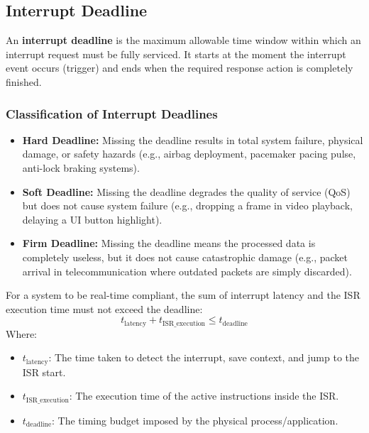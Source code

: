 \documentclass[12pt,a4paper]{article}
\begin{document}
\subsection{Interrupt Deadline}

\begin{tcolorbox}[defbox, title={\textbf{Interrupt Deadline}}]
An \textbf{interrupt deadline} is the maximum allowable time window within which an interrupt request must be fully serviced. It starts at the moment the interrupt event occurs (trigger) and ends when the required response action is completely finished.
\end{tcolorbox}

\subsubsection{Classification of Interrupt Deadlines}
\begin{itemize}[leftmargin=*, itemsep=3pt]
  \item \textbf{Hard Deadline:} Missing the deadline results in total system failure, physical damage, or safety hazards (e.g., airbag deployment, pacemaker pacing pulse, anti-lock braking systems).
  \item \textbf{Soft Deadline:} Missing the deadline degrades the quality of service (QoS) but does not cause system failure (e.g., dropping a frame in video playback, delaying a UI button highlight).
  \item \textbf{Firm Deadline:} Missing the deadline means the processed data is completely useless, but it does not cause catastrophic damage (e.g., packet arrival in telecommunication where outdated packets are simply discarded).
\end{itemize}

\begin{tcolorbox}[formulabox, title={\textbf{Real-Time Constraint \& Timing Budget}}]
For a system to be real-time compliant, the sum of interrupt latency and the ISR execution time must not exceed the deadline:
\[
t_{\text{latency}} + t_{\text{ISR\_execution}} \leq t_{\text{deadline}}
\]
Where:
\begin{itemize}[leftmargin=*, itemsep=2pt, topsep=4pt]
  \item $t_{\text{latency}}$: The time taken to detect the interrupt, save context, and jump to the ISR start.
  \item $t_{\text{ISR\_execution}}$: The execution time of the active instructions inside the ISR.
  \item $t_{\text{deadline}}$: The timing budget imposed by the physical process/application.
\end{itemize}
\end{tcolorbox}
\end{document}
